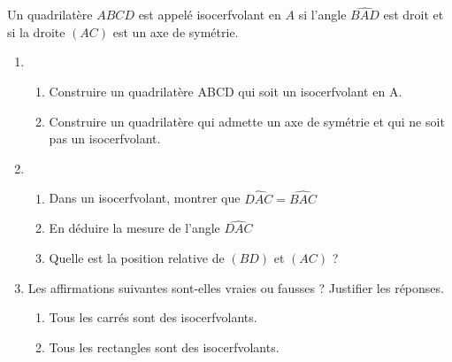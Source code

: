 \begin{colonne*exercice}
\begin{exercice}
   Un quadrilatère $ABCD$ est appelé isocerfvolant en $A$ si l'angle $\widehat{BAD}$ est droit et si la droite $(AC)$ est un axe de symétrie.
   \begin{enumerate}
      \item
      \begin{enumerate}
         \item Construire un quadrilatère ABCD qui soit un isocerfvolant en A.
         \item Construire un quadrilatère qui admette un axe de symétrie et qui ne soit pas un isocerfvolant.
      \end{enumerate}
      \item
      \begin{enumerate}
         \item Dans un isocerfvolant, montrer que $\widehat{DAC} =\widehat{BAC}$
         \item En déduire la mesure de l'angle $\widehat{DAC}$
         \item Quelle est la position relative de $(BD)$ et $(AC)$ ?
      \end{enumerate}
      \item Les affirmations suivantes sont-elles vraies ou fausses ? Justifier les réponses.
      \begin{enumerate}
         \item Tous les carrés sont des isocerfvolants.
         \item Tous les rectangles sont des isocerfvolants.
      \end{enumerate}
   \end{enumerate}
\end{exercice}


\end{colonne*exercice}
